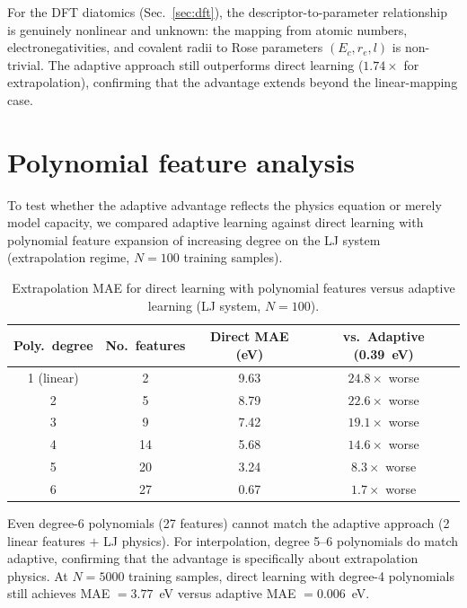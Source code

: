 \documentclass[aps,prb,twocolumn,superscriptaddress,longbibliography,floatfix]{revtex4-2}
\begin{document}
For the DFT diatomics (Sec.~\ref{sec:dft}), the descriptor-to-parameter relationship is genuinely nonlinear and unknown: the mapping from atomic numbers, electronegativities, and covalent radii to Rose parameters $(E_c, r_e, l)$ is non-trivial. The adaptive approach still outperforms direct learning ($1.74\times$ for extrapolation), confirming that the advantage extends beyond the linear-mapping case.


\section{Polynomial feature analysis}
\label{app:polynomial}

To test whether the adaptive advantage reflects the physics equation or merely model capacity, we compared adaptive learning against direct learning with polynomial feature expansion of increasing degree on the LJ system (extrapolation regime, $N = 100$ training samples).

\begin{table}[h]
  \caption{Extrapolation MAE for direct learning with polynomial features versus adaptive learning (LJ system, $N = 100$).}
  \label{tab:polynomial}
  \begin{ruledtabular}
  \begin{tabular}{cccc}
    Poly.\ degree & No.\ features & Direct MAE (eV) & vs.\ Adaptive (0.39~eV) \\
    \hline
    1 (linear) & 2 & 9.63 & $24.8\times$ worse \\
    2 & 5 & 8.79 & $22.6\times$ worse \\
    3 & 9 & 7.42 & $19.1\times$ worse \\
    4 & 14 & 5.68 & $14.6\times$ worse \\
    5 & 20 & 3.24 & $8.3\times$ worse \\
    6 & 27 & 0.67 & $1.7\times$ worse \\
  \end{tabular}
  \end{ruledtabular}
\end{table}

Even degree-6 polynomials (27 features) cannot match the adaptive approach (2 linear features $+$ LJ physics). For interpolation, degree 5--6 polynomials do match adaptive, confirming that the advantage is specifically about extrapolation physics. At $N = 5000$ training samples, direct learning with degree-4 polynomials still achieves MAE $= 3.77$~eV versus adaptive MAE $= 0.006$~eV.
\end{document}
